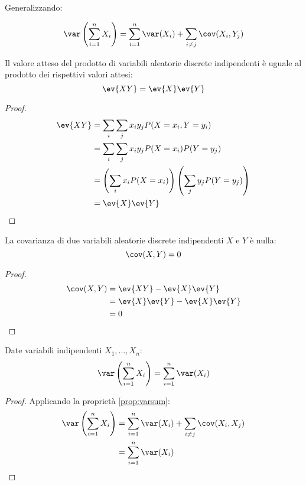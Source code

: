 Generalizzando:
\begin{prop} \label{prop:varsumcov}
	\begin{equation*}
		\var\left(\sum_{i=1}^n X_i\right) = \sum_{i=1}^n \var(X_i) + \sum_{i\neq j}\cov(X_i,Y_j)
	\end{equation*}
\end{prop}
\noindent

\begin{teor}
	Il valore atteso del prodotto di variabili aleatorie discrete indipendenti è uguale al prodotto dei rispettivi valori attesi:
	\begin{equation*}
		\ev{XY} = \ev{X}\ev{Y}
	\end{equation*}
\end{teor}
\begin{proof}
	\begin{align*}
		\ev{XY} & = \sum_i\sum_j x_i y_j P(X=x_i,Y=y_i)                              \\
		        & = \sum_i\sum_j x_i y_j P(X=x_i)P(Y=y_j)                            \\
		        & = \left(\sum_i x_i P(X=x_i)\right)\left(\sum_j y_j P(Y=y_j)\right) \\
		        & = \ev{X}\ev{Y}
	\end{align*}
\end{proof}

\begin{corol}
	La covarianza di due variabili aleatorie discrete indipendenti $X$ e $Y$ è nulla:
	\begin{equation*}
		\cov(X,Y) = 0
	\end{equation*}
\end{corol}
\begin{proof}
	\begin{align*}
		\cov(X,Y) & = \ev{XY}-\ev{X}\ev{Y}      \\
		          & = \ev{X}\ev{Y}-\ev{X}\ev{Y} \\
		          & = 0
	\end{align*}
\end{proof}

\begin{corol}
	Date variabili indipendenti $X_1,\dots,X_n$:
	\begin{equation*}
		\var\left(\sum_{i=1}^n X_i\right) = \sum_{i=1}^n \var(X_i)
	\end{equation*}
\end{corol}
\begin{proof}
	Applicando la proprietà \ref{prop:varsum}:
	\begin{align*}
		\var\left(\sum_{i=1}^n X_i\right) & = \sum_{i=1}^n\var(X_i)+\sum_{i\neq j}\cov(X_i,X_j) \\
		                                  & = \sum_{i=1}^n \var(X_i)
	\end{align*}
\end{proof}

